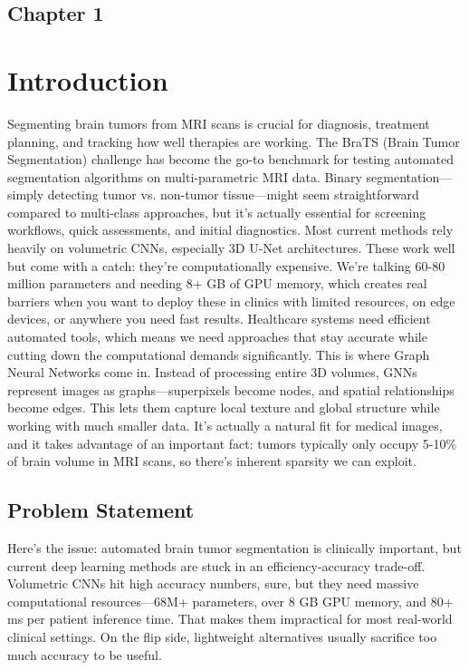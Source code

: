 \begin{center}
    \section*{\fontsize{20}{20}\selectfont Chapter 1}
\end{center}
\vspace{10mm}
\section{Introduction}

Segmenting brain tumors from MRI scans is crucial for diagnosis, treatment planning, and tracking how well therapies are working. The BraTS (Brain Tumor Segmentation) challenge has become the go-to benchmark for testing automated segmentation algorithms on multi-parametric MRI data. Binary segmentation—simply detecting tumor vs. non-tumor tissue—might seem straightforward compared to multi-class approaches, but it's actually essential for screening workflows, quick assessments, and initial diagnostics. Most current methods rely heavily on volumetric CNNs, especially 3D U-Net architectures. These work well but come with a catch: they're computationally expensive. We're talking 60-80 million parameters and needing 8+ GB of GPU memory, which creates real barriers when you want to deploy these in clinics with limited resources, on edge devices, or anywhere you need fast results. Healthcare systems need efficient automated tools, which means we need approaches that stay accurate while cutting down the computational demands significantly. This is where Graph Neural Networks come in. Instead of processing entire 3D volumes, GNNs represent images as graphs—superpixels become nodes, and spatial relationships become edges. This lets them capture local texture and global structure while working with much smaller data. It's actually a natural fit for medical images, and it takes advantage of an important fact: tumors typically only occupy 5-10\% of brain volume in MRI scans, so there's inherent sparsity we can exploit.


\subsection{Problem Statement}

Here's the issue: automated brain tumor segmentation is clinically important, but current deep learning methods are stuck in an efficiency-accuracy trade-off. Volumetric CNNs hit high accuracy numbers, sure, but they need massive computational resources—68M+ parameters, over 8 GB GPU memory, and 80+ ms per patient inference time. That makes them impractical for most real-world clinical settings. On the flip side, lightweight alternatives usually sacrifice too much accuracy to be useful.

